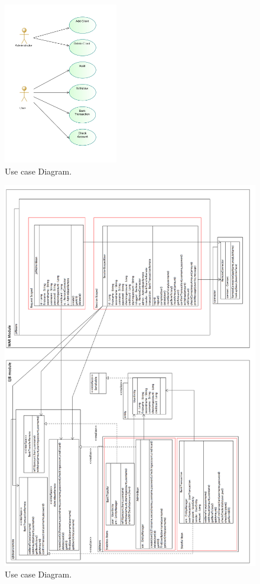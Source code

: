 \documentclass[a4paper]{article}
\begin{document}
\begin{figure}[ht]
  \centering
  \includegraphics[keepaspectratio=true, width=5cm]{use_case_diagram}\caption{Use case Diagram.}
  \label{fig:use_case_diagram}
\end{figure}

\begin{figure}[ht]
  \centering
  \includegraphics[keepaspectratio=true, width=\textwidth, height=\textheight]{ClassDiagram2.png}\caption{Use case Diagram.}
  \label{fig:classdiagram}
\end{figure}
\end{document}
